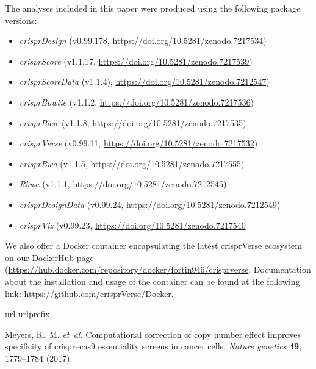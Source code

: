 \documentclass[pdftex,english,10pt]{article}
\begin{document}
{The analyses included in this paper were produced using the following package versions: 
\begin{itemize}
\item \textit{crisprDesign} (v0.99.178, \url{https://doi.org/10.5281/zenodo.7217534})
\item \textit{crisprScore} (v1.1.17, \url{https://doi.org/10.5281/zenodo.7217539})
\item \textit{crisprScoreData} (v1.1.4), \url{https://doi.org/10.5281/zenodo.7212547})
\item \textit{crisprBowtie} (v1.1.2, \url{https://doi.org/10.5281/zenodo.7217536})
\item \textit{crisprBase} (v1.1.8, \url{https://doi.org/10.5281/zenodo.7217535})
\item \textit{crisprVerse} (v0.99.11, \url{https://doi.org/10.5281/zenodo.7217532})
\item \textit{crisprBwa} (v1.1.5, \url{https://doi.org/10.5281/zenodo.7217555})
\item \textit{Rbwa} (v1.1.1, \url{https://doi.org/10.5281/zenodo.7212545})
\item \textit{crisprDesignData} (v0.99.24, \url{https://doi.org/10.5281/zenodo.7212549})
\item \textit{crisprViz} (v0.99.23, \url{https://doi.org/10.5281/zenodo.7217540}
\end{itemize}

We also offer a Docker container encapsulating the latest crisprVerse ecosystem on our DockerHub page (\url{https://hub.docker.com/repository/docker/fortin946/crisprverse}. 
Documentation about the installation and usage of the container can be found at the following link: \url{https://github.com/crisprVerse/Docker}.








\begin{thebibliography}{100}
\expandafter\ifx\csname url\endcsname\relax
  \def\url#1{\texttt{#1}}\fi
\expandafter\ifx\csname urlprefix\endcsname\relax\def\urlprefix{URL }\fi
\providecommand{\bibinfo}[2]{#2}
\providecommand{\eprint}[2][]{\url{#2}}

\bibinfo{author}{Meyers, R.~M.} \emph{et~al.}
\newblock \bibinfo{title}{Computational correction of copy number effect
  improves specificity of crispr--cas9 essentiality screens in cancer cells}.
\newblock \emph{\bibinfo{journal}{Nature genetics}}
  \textbf{\bibinfo{volume}{49}}, \bibinfo{pages}{1779--1784}
  (\bibinfo{year}{2017}).


\end{thebibliography}}
\end{document}
